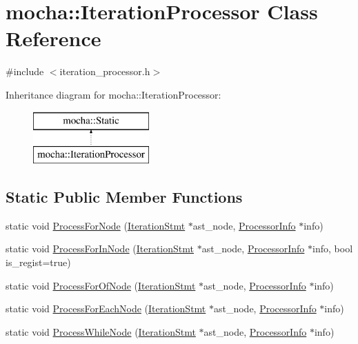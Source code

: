 \hypertarget{classmocha_1_1_iteration_processor}{
\section{mocha::IterationProcessor Class Reference}
\label{classmocha_1_1_iteration_processor}
}


{\ttfamily \#include $<$iteration\_\-processor.h$>$}

Inheritance diagram for mocha::IterationProcessor:\begin{figure}[H]
\begin{center}
\leavevmode
\includegraphics[height=2.000000cm]{classmocha_1_1_iteration_processor}
\end{center}
\end{figure}
\subsection*{Static Public Member Functions}
\begin{DoxyCompactItemize}
\item 
static void \hyperlink{classmocha_1_1_iteration_processor_a71b1bfabd5e593e115e581b363de1309}{ProcessForNode} (\hyperlink{classmocha_1_1_iteration_stmt}{IterationStmt} $\ast$ast\_\-node, \hyperlink{classmocha_1_1_processor_info}{ProcessorInfo} $\ast$info)
\item 
static void \hyperlink{classmocha_1_1_iteration_processor_af2201f1d9fbe61092e028b698e12c9f2}{ProcessForInNode} (\hyperlink{classmocha_1_1_iteration_stmt}{IterationStmt} $\ast$ast\_\-node, \hyperlink{classmocha_1_1_processor_info}{ProcessorInfo} $\ast$info, bool is\_\-regist=true)
\item 
static void \hyperlink{classmocha_1_1_iteration_processor_a67a04e80e75aa882543e6074b1ad7ebb}{ProcessForOfNode} (\hyperlink{classmocha_1_1_iteration_stmt}{IterationStmt} $\ast$ast\_\-node, \hyperlink{classmocha_1_1_processor_info}{ProcessorInfo} $\ast$info)
\item 
static void \hyperlink{classmocha_1_1_iteration_processor_a161534483dd981dd4da2d6044bd7a3e9}{ProcessForEachNode} (\hyperlink{classmocha_1_1_iteration_stmt}{IterationStmt} $\ast$ast\_\-node, \hyperlink{classmocha_1_1_processor_info}{ProcessorInfo} $\ast$info)
\item 
static void \hyperlink{classmocha_1_1_iteration_processor_a014c5c866557fbcccfec1095b316e903}{ProcessWhileNode} (\hyperlink{classmocha_1_1_iteration_stmt}{IterationStmt} $\ast$ast\_\-node, \hyperlink{classmocha_1_1_processor_info}{ProcessorInfo} $\ast$info)
\end{DoxyCompactItemize}


